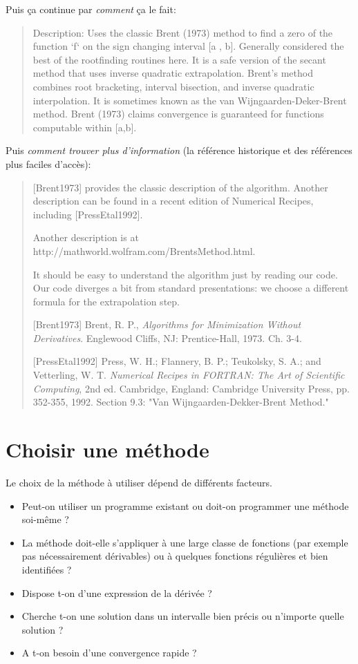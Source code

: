 Puis ça continue par \emph{comment} ça le fait:
\begin{quote}
Description:
Uses the classic Brent (1973) method to find a zero of the function `f` on
the sign changing interval [a , b].  Generally considered the best of the
rootfinding routines here.  It is a safe version of the secant method that
uses inverse quadratic extrapolation.  Brent's method combines root
bracketing, interval bisection, and inverse quadratic interpolation.  It is
sometimes known as the van Wijngaarden-Deker-Brent method.  Brent (1973)
claims convergence is guaranteed for functions computable within
[a,b].
\end{quote}

Puis \emph{comment trouver plus d'information} (la référence
historique et des références plus faciles d'accès):
\begin{quote}
[Brent1973] provides the classic description of the algorithm.  Another
description can be found in a recent edition of Numerical Recipes, including
[PressEtal1992].  

Another description is at
http://mathworld.wolfram.com/BrentsMethod.html.  

It should be easy to
understand the algorithm just by reading our code.  Our code diverges a bit
from standard presentations: we choose a different formula for the
extrapolation step.

[Brent1973]
   Brent, R. P.,
   \emph{Algorithms for Minimization Without Derivatives}.
   Englewood Cliffs, NJ: Prentice-Hall, 1973. Ch. 3-4.

[PressEtal1992]
   Press, W. H.; Flannery, B. P.; Teukolsky, S. A.; and Vetterling, W. T.
   \emph{Numerical Recipes in FORTRAN: The Art of Scientific Computing}, 2nd ed.
   Cambridge, England: Cambridge University Press, pp. 352-355, 1992.
   Section 9.3:  "Van Wijngaarden-Dekker-Brent Method."
\end{quote}

\section{Choisir une méthode}

Le choix de la méthode à utiliser dépend de différents facteurs. 
\begin{itemize}
\item Peut-on utiliser un programme existant ou doit-on programmer une
  méthode soi-même ?
\item La méthode doit-elle s'appliquer à une large classe de fonctions
  (par exemple pas nécessairement dérivables) ou à quelques fonctions
  régulières et bien identifiées ?
\item Dispose t-on d'une expression de la dérivée ?
\item Cherche t-on une solution dans un intervalle bien précis ou
  n'importe quelle solution ?
\item A t-on besoin d'une convergence rapide ?
\end{itemize}

